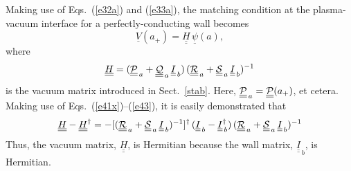 \documentclass[12pt,prb,aps]{revtex4-1}
\begin{document}
  Making use of Eqs.~(\ref{e32a}) and (\ref{e33a}),  the matching condition at the plasma-vacuum interface  for a perfectly-conducting wall becomes 
 \begin{equation}
 \underline{V}(a_+)= \underline{\underline{H}}\,\underline{\psi}(a),
 \end{equation}
 where 
 \begin{equation}
 \underline{\underline{H}}= (\underline{\underline{\cal P}}_{\,a}+\underline{\underline{\cal Q}}_{\,a}\,\underline{\underline{I}}_{\,b})\,(\underline{\underline{\cal R}}_{\,a}+\underline{\underline{\cal S}}_{\,a}\,\underline{\underline{I}}_{\,b})^{-1}
 \end{equation}
 is  the vacuum matrix introduced in Sect.~\ref{stab}. 
  Here, $\underline{\underline{\cal P}}_{\,a}= \underline{\underline{\cal P}}(a_+)$, et cetera. 
Making use of Eqs.~(\ref{e41x})--(\ref{e43}), it is easily demonstrated that
 \begin{equation}\label{e53}
 \underline{\underline{H}}-\underline{\underline{H}}^\dag =- [(\underline{\underline{\cal R}}_{\,a}+\underline{\underline{\cal S}}_{\,a}\,\underline{\underline{I}}_{\,b})^{-1}]^{\dag}\,(\underline{\underline{I}}_{\,b} -\underline{\underline{I}}^\dag_{\,b})\,  (\underline{\underline{\cal R}}_{\,a}+\underline{\underline{\cal S}}_{\,a}\,\underline{\underline{I}}_{\,b})^{-1}
\end{equation}
Thus,  the vacuum matrix, $\underline{\underline{H}}$, is Hermitian because  the wall matrix, $\underline{\underline{I}}_{\,b}$, is Hermitian. 
 
\end{document}

